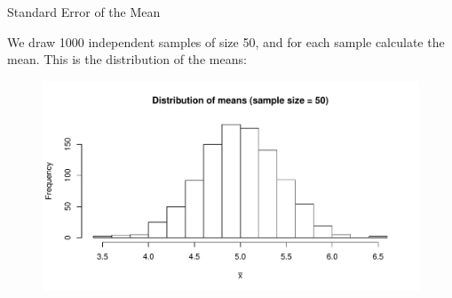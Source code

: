\begin{frame}{Standard Error of the Mean}

    We draw 1000 independent samples of size 50, and for each sample calculate the mean. This is the distribution of the means:
    
    \begin{figure}
        \includegraphics[width=\linewidth]{R/plots/se-sampling-distribution-50}
    \end{figure}
    
\end{frame}

